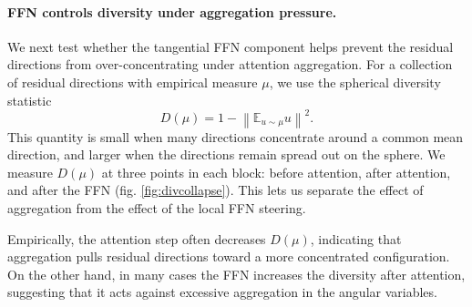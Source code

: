\documentclass[11pt]{article}
\begin{document}


\paragraph{FFN controls diversity under aggregation pressure.}
We next test whether the tangential FFN component helps prevent the residual
directions from over-concentrating under attention aggregation. For a collection
of residual directions with empirical measure $\mu$, we use the spherical
diversity statistic
\begin{equation}
D(\mu)
=
1-\left\|
\mathbb{E}_{u\sim\mu} u
\right\|^2.
\label{eq:sphere_div}
\end{equation}
This quantity is small when many directions concentrate around a common mean
direction, and larger when the directions remain spread out on the sphere. We
measure $D(\mu)$ at three points in each block: before attention, after
attention, and after the FFN (fig. \ref{fig:divcollapse}). This lets us separate the effect of aggregation
from the effect of the local FFN steering.

Empirically, the attention step often decreases
$D(\mu)$, indicating that aggregation pulls residual directions toward a more
concentrated configuration. On the other hand, in many cases the FFN increases the diversity after attention, suggesting that it acts against excessive
aggregation in the angular variables.

\end{document}
